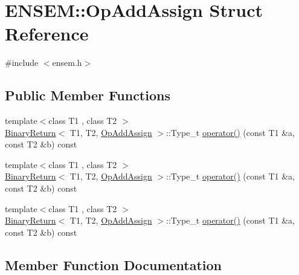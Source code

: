 \hypertarget{structENSEM_1_1OpAddAssign}{}\section{E\+N\+S\+EM\+:\+:Op\+Add\+Assign Struct Reference}
\label{structENSEM_1_1OpAddAssign}


{\ttfamily \#include $<$ensem.\+h$>$}

\subsection*{Public Member Functions}
\begin{DoxyCompactItemize}
\item 
{\footnotesize template$<$class T1 , class T2 $>$ }\\\mbox{\hyperlink{structENSEM_1_1BinaryReturn}{Binary\+Return}}$<$ T1, T2, \mbox{\hyperlink{structENSEM_1_1OpAddAssign}{Op\+Add\+Assign}} $>$\+::Type\+\_\+t \mbox{\hyperlink{structENSEM_1_1OpAddAssign_a115e2f2eb7eaf306b7af0ad00e7801b8}{operator()}} (const T1 \&a, const T2 \&b) const
\item 
{\footnotesize template$<$class T1 , class T2 $>$ }\\\mbox{\hyperlink{structENSEM_1_1BinaryReturn}{Binary\+Return}}$<$ T1, T2, \mbox{\hyperlink{structENSEM_1_1OpAddAssign}{Op\+Add\+Assign}} $>$\+::Type\+\_\+t \mbox{\hyperlink{structENSEM_1_1OpAddAssign_a115e2f2eb7eaf306b7af0ad00e7801b8}{operator()}} (const T1 \&a, const T2 \&b) const
\item 
{\footnotesize template$<$class T1 , class T2 $>$ }\\\mbox{\hyperlink{structENSEM_1_1BinaryReturn}{Binary\+Return}}$<$ T1, T2, \mbox{\hyperlink{structENSEM_1_1OpAddAssign}{Op\+Add\+Assign}} $>$\+::Type\+\_\+t \mbox{\hyperlink{structENSEM_1_1OpAddAssign_a115e2f2eb7eaf306b7af0ad00e7801b8}{operator()}} (const T1 \&a, const T2 \&b) const
\end{DoxyCompactItemize}


\subsection{Member Function Documentation}
\mbox{\label{structENSEM_1_1OpAddAssign_a115e2f2eb7eaf306b7af0ad00e7801b8}} 
